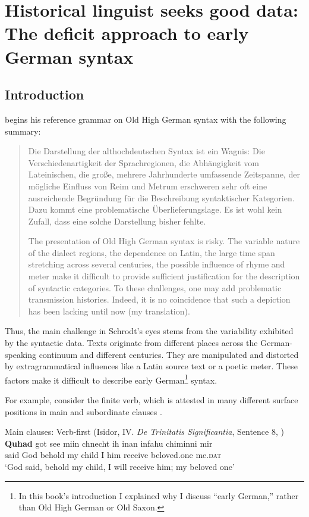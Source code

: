 \chapter[Historical linguist seeks good data]
        {Historical linguist seeks good data: The deficit approach to early German syntax}\label{sec:chap:2}

\section{Introduction}
\citet[vii]{Schrodt2004} begins his reference grammar on Old High German syntax with the following summary:
\begin{quote}
    Die Darstellung der althochdeutschen Syntax ist ein Wagnis: Die Verschiedenartigkeit der Sprachregionen, die Abhängigkeit vom Lateini\-schen, die große, mehrere Jahrhunderte umfassende Zeitspanne, der mögliche Einfluss von Reim und Metrum erschweren sehr oft eine aus\-reichende Begründung für die Beschreibung syntaktischer Kategorien. Dazu kommt eine problematische Überlieferungslage. Es ist wohl kein Zufall, dass eine solche Darstellung bisher fehlte.

    The presentation of Old High German syntax is risky. The variable nature of the dialect regions, the dependence on Latin, the large time span stretching across several centuries, the possible influence of rhyme and meter make it difficult to provide sufficient justification for the description of syntactic categories. To these challenges, one may add problematic transmission histories. Indeed, it is no coincidence that such a depiction has been lacking until now (my translation).
\end{quote}

\noindent Thus, the main challenge in Schrodt’s eyes stems from the variability exhibited by the syntactic data. Texts originate from different places across the German-speaking continuum and different centuries. They are manipulated and distorted by extragrammatical influences like a Latin source text or a poetic meter. These factors make it difficult to describe early German\footnote{In this book’s introduction I explained why I discuss “early German,” rather than Old High German or Old Saxon.} syntax.

For example, consider the finite verb, which is attested in many different surface positions in main  and subordinate clauses .

\ea%
\label{ex:2:1}Main clauses:
\ea Verb-first (Isidor, IV. \textit{De Trinitatis Significantia}, Sentence 8, \citealt{Eggers1964})\\
\gll \textbf{Quhad}  got    see    miin chnecht  ih  inan   infahu  chiminni     mir\\
said     God    behold  my  child     I   him   receive    beloved.one     me.\textsc{dat}\\
\glt ‘God said, behold my child, I will receive him; my beloved one’

